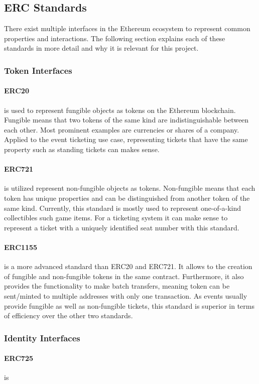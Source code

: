 \subsection{ERC Standards}

There exist multiple interfaces in the Ethereum ecosystem to represent common properties and interactions. The following section explains each of these standards in more detail and why it is relevant for this project.

\subsubsection{Token Interfaces}\label{subsubsection:token-interfaces}

\paragraph{ERC20} is used to represent fungible objects as tokens on the Ethereum blockchain. Fungible means that two tokens of the same kind are indistinguishable between each other. Most prominent examples are currencies or shares of a company. Applied to the event ticketing use case, representing tickets that have the same property such as standing tickets can makes sense.

\paragraph{ERC721} is utilized represent non-fungible objects as tokens. Non-fungible means that each token has unique properties and can be distinguished from another token of the same kind. Currently, this standard is mostly used to represent one-of-a-kind collectibles such game items. For a ticketing system it can make sense to represent a ticket with a uniquely identified seat number with this standard. 

\paragraph{ERC1155} is a more advanced standard than ERC20 and ERC721. It allows to the creation of fungible and non-fungible tokens in the same contract. Furthermore, it also provides the functionality to make batch transfers, meaning token can be sent/minted to multiple addresses with only one transaction. As events usually provide fungible as well as non-fungible tickets, this standard is superior in terms of efficiency over the other two standards.

\subsubsection{Identity Interfaces}

\paragraph{ERC725} is
